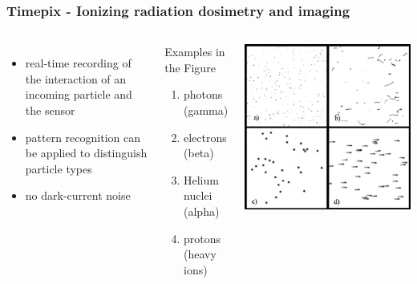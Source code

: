 \documentclass[aspectratio=169]{beamer}
\begin{document}
\begin{frame}
\frametitle{Timepix - Ionizing radiation dosimetry and imaging}

\begin{columns}[c]


\begin{itemize}
  \item real-time recording of the interaction of an incoming particle and the sensor
  \item pattern recognition can be applied to distinguish particle types \cite{baca2018timepix}
  \item no dark-current noise
\end{itemize}

\begin{block}{Examples in the Figure}
\begin{enumerate}[label=(\alph*)]
  \item photons (gamma)
  \item electrons (beta)
  \item Helium nuclei (alpha)
  \item protons (heavy ions)
\end{enumerate}
\end{block}

\includegraphics[width=1.0\textwidth]{./fig/particle_types_inverted.png}

\end{columns}

\end{frame}
\end{document}
